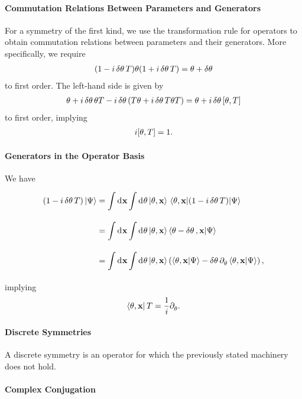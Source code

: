 \paragraph{Commutation Relations Between Parameters and Generators}
For a symmetry of the first kind, we use the transformation rule for operators to obtain commutation relations between parameters and their generators. More specifically, we require
\begin{align*}
	(1 - i\var{\theta}T)\theta(1 + i\var{\theta}T) = \theta + \var{\theta}
\end{align*}
to first order. The left-hand side is given by
\begin{align*}
	\theta + i\var{\theta}\theta T - i\var{\theta}(T\theta + i\var{\theta}T\theta T) = \theta + i\var{\theta}\comm{\theta}{T}
\end{align*}
to first order, implying
\begin{align*}
	i\comm{\theta}{T} = 1.
\end{align*}

\paragraph{Generators in the Operator Basis}
We have
\begin{align*}
	\left(1 - i\var{\theta}T\right)\ket{\Psi} &= \int\limits_{}^{}\dd[]{\vb{x}}\int\limits_{}^{}\dd[]{\theta}\ket{\theta, \vb{x}}\mel{\theta, \vb{x}}{\left(1 - i\var{\theta}T\right)}{\Psi} \\
	                                          &= \int\limits_{}^{}\dd[]{\vb{x}}\int\limits_{}^{}\dd[]{\theta}\ket{\theta, \vb{x}}\braket{\theta - \var{\theta}, \vb{x}}{\Psi} \\
	                                          &= \int\limits_{}^{}\dd[]{\vb{x}}\int\limits_{}^{}\dd[]{\theta}\ket{\theta, \vb{x}}\left(\braket{\theta, \vb{x}}{\Psi} - \var{\theta}\partial_{\theta}^{}\braket{\theta, \vb{x}}{\Psi}\right),
\end{align*}
implying
\begin{align*}
	\bra{\theta, \vb{x}}T = \frac{1}{i}\partial_{\theta}^{}.
\end{align*}

\paragraph{Discrete Symmetries}
A discrete symmetry is an operator for which the previously stated machinery does not hold.

\paragraph{Complex Conjugation}

